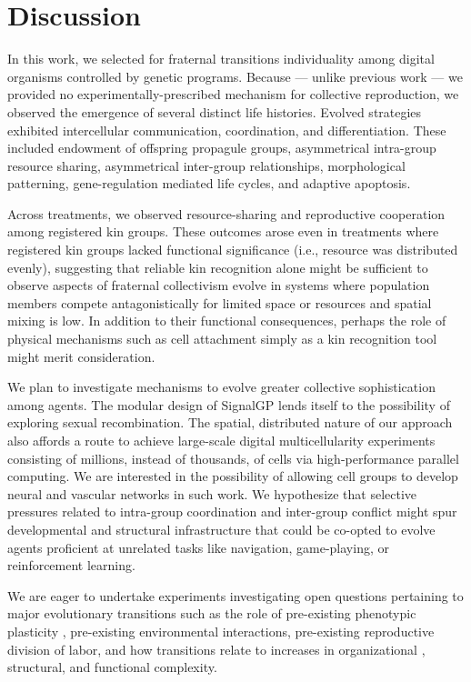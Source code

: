 \section{Discussion}


In this work, we selected for fraternal transitions individuality among digital organisms controlled by genetic programs.
Because --- unlike previous work --- we provided no experimentally-prescribed mechanism for collective reproduction, we observed the emergence of several distinct life histories.
Evolved strategies exhibited intercellular communication, coordination, and differentiation.
These included endowment of offspring propagule groups, asymmetrical intra-group resource sharing, asymmetrical inter-group relationships, morphological patterning, gene-regulation mediated life cycles, and adaptive apoptosis.

Across treatments, we observed resource-sharing and reproductive cooperation among registered kin groups.
These outcomes arose even in treatments where registered kin groups lacked functional significance (i.e., resource was distributed evenly), suggesting that reliable kin recognition alone might be sufficient to observe aspects of fraternal collectivism evolve in systems where population members compete antagonistically for limited space or resources and spatial mixing is low.
In addition to their functional consequences, perhaps the role of physical mechanisms such as cell attachment simply as a kin recognition tool might merit consideration.

We plan to investigate mechanisms to evolve greater collective sophistication among agents.
The modular design of SignalGP lends itself to the possibility of exploring sexual recombination.
The spatial, distributed nature of our approach also affords a route to achieve large-scale digital multicellularity experiments consisting of millions, instead of thousands, of cells via high-performance parallel computing.
We are interested in the possibility of allowing cell groups to develop neural and vascular networks in such work.
We hypothesize that selective pressures related to intra-group coordination and inter-group conflict might spur developmental and structural infrastructure that could be co-opted to evolve agents proficient at unrelated tasks like navigation, game-playing, or reinforcement learning.

We are eager to undertake experiments investigating open questions pertaining to major evolutionary transitions such as the role of pre-existing phenotypic plasticity \citep{clune2007investigating, lalejini2016evolutionary}, pre-existing environmental interactions, pre-existing reproductive division of labor, and how transitions relate to increases in organizational \citep{goldsby2012task}, structural, and functional \citep{goldsby2014evolutionary} complexity.
